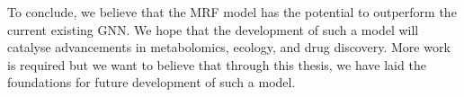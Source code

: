 \documentclass[
11pt, %
oneside, %
english, %
singlespacing, %
headsepline, %
chapterinoneline, %
]{MastersDoctoralThesis} %
\begin{document}
To conclude, we believe that the MRF model has the potential to outperform the current existing GNN. We hope that the development of such a model will catalyse advancements in metabolomics, ecology, and drug discovery. More work is required but we want to believe that through this thesis, we have laid the foundations for future development of such a model.


\appendix %


%
%
%

\renewcommand{\bibname}{References}




\end{document}
